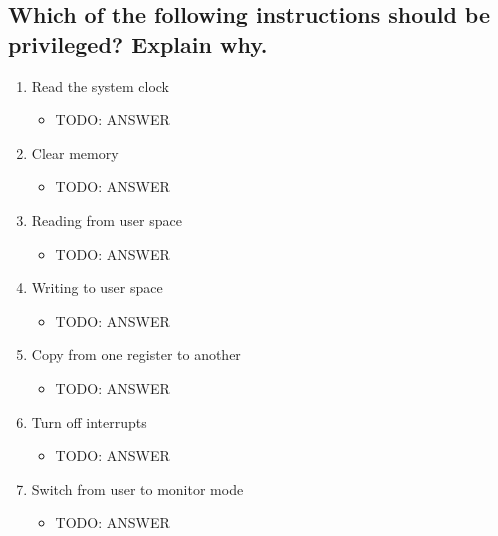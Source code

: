 \documentclass[nobib]{MSword}
\begin{document}
\subsection*{Which of the following instructions should be privileged? Explain why.}
\begin{enumerate}[label=(\roman*)]
  \item Read the system clock 
  \begin{itemize}[label={}]
  \item TODO: ANSWER
  \end{itemize}
  
  \item Clear memory 
  \begin{itemize}[label={}]
  \item TODO: ANSWER
  \end{itemize}
  
  \item Reading from user space 
  \begin{itemize}[label={}]
  \item TODO: ANSWER
  \end{itemize}
  
  \item Writing to user space 
  \begin{itemize}[label={}]
  \item TODO: ANSWER
  \end{itemize}
  
  \item Copy from one register to another 
  \begin{itemize}[label={}]
  \item TODO: ANSWER
  \end{itemize}
  
  \item Turn off interrupts 
  \begin{itemize}[label={}]
  \item TODO: ANSWER
  \end{itemize}
  
  \item Switch from user to monitor mode 
  \begin{itemize}[label={}]
  \item TODO: ANSWER
  \end{itemize}
\end{enumerate}

\pagebreak


\end{document}
